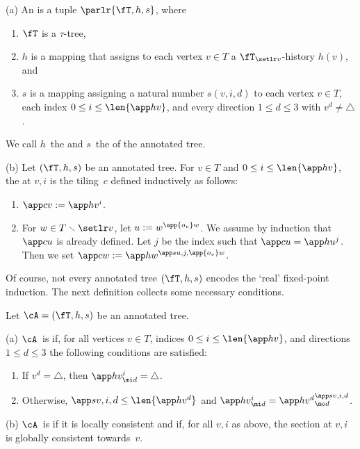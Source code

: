 \documentclass{LMCS}
\begin{document}
\begin{defi}
\textup{(a)}
An  is a tuple $\parlr{\fT,h,s}$, where
\begin{enumerate}
\item $\fT$ is a $\tau$-tree,
\item $h$ is a mapping that assigns to each vertex $v\in T$ a $\fT_{\setlr v}$-history $h(v)$, and
\item $s$ is a mapping assigning a natural number $s(v,i,d)$
  to each vertex $v\in T$, each index $0\leq i\leq\len{\app hv}$, and every direction $1\leq d\leq 3$
  with $v^d \neq \triangle$.
\end{enumerate}
We call $h$~the  and $s$~the  of the annotated tree.

\textup{(b)}
Let $(\fT,h,s)$ be an annotated tree.
For $v\in T$ and $0\leq i\leq\len{\app hv}$,
the  at $v,i$
is the tiling~$c$ defined inductively as follows\?:
\begin{enumerate}
\item $\app cv:=\app hv^i$.
\item For $w\in T\smallsetminus\setlr v$, let $u:=w^{\app{o_v}w}$.
  We assume by induction that $\app cu$ is already defined.
  Let $j$ be the index such that $\app cu=\app hu^j$.
  Then we set $\app cw:=\app hw^{\app s{u,j,\app{o_v}w}}$.
\end{enumerate}
\end{defi}

\noindent Of course, not every annotated tree $(\fT,h,s)$
encodes the `real' fixed-point induction.
The next definition collects some necessary conditions.
\begin{defi}
Let $\cA = (\fT,h,s)$ be an annotated tree.

\textup{(a)}
$\cA$~is 
if, for all vertices $v\in T$, indices $0\leq i\leq\len{\app hv}$, and directions $1\leq d\leq 3$
the following conditions are satisfied\?:
\begin{enumerate}
\item If $v^d=\triangle$,
  then $\app hv^i_{\mi d} = \triangle$.
\item Otherwise, $\app s{v,i,d}\leq\len{\app h{v^d}}$
  and $\app hv^i_{\mi d}=\app h{v^d}^{\app s{v,i,d}}_{\mo d}$.
\end{enumerate}

\textup{(b)}
$\cA$~is 
if it is locally consistent
and if, for all $v,i$ as above, the section at $v,i$
is globally consistent towards~$v$.
\end{defi}
\end{document}
